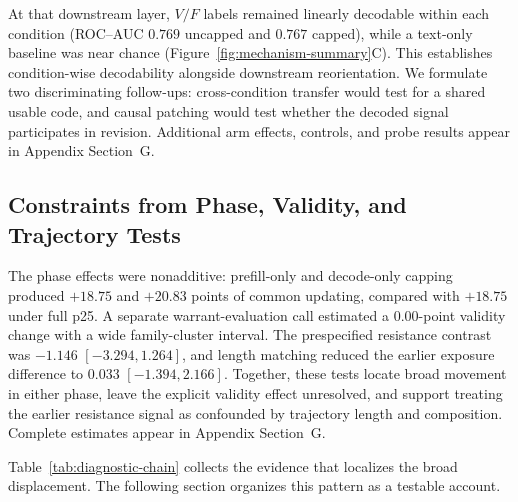 \documentclass[letterpaper]{article} %
\begin{document}
At that downstream layer, $V/F$ labels remained linearly decodable within each condition (ROC--AUC $0.769$ uncapped and $0.767$ capped), while a text-only baseline was near chance (Figure~\ref{fig:mechanism-summary}C). This establishes condition-wise decodability alongside downstream reorientation. We formulate two discriminating follow-ups: cross-condition transfer would test for a shared usable code, and causal patching would test whether the decoded signal participates in revision. Additional arm effects, controls, and probe results appear in Appendix Section~G.

\subsection{Constraints from Phase, Validity, and Trajectory Tests}

The phase effects were nonadditive: prefill-only and decode-only capping produced $+18.75$ and $+20.83$ points of common updating, compared with $+18.75$ under full p25. A separate warrant-evaluation call estimated a $0.00$-point validity change with a wide family-cluster interval. The prespecified resistance contrast was $-1.146$ $[-3.294,1.264]$, and length matching reduced the earlier exposure difference to $0.033$ $[-1.394,2.166]$. Together, these tests locate broad movement in either phase, leave the explicit validity effect unresolved, and support treating the earlier resistance signal as confounded by trajectory length and composition. Complete estimates appear in Appendix Section~G.

Table~\ref{tab:diagnostic-chain} collects the evidence that localizes the broad displacement. The following section organizes this pattern as a testable account.
\end{document}
